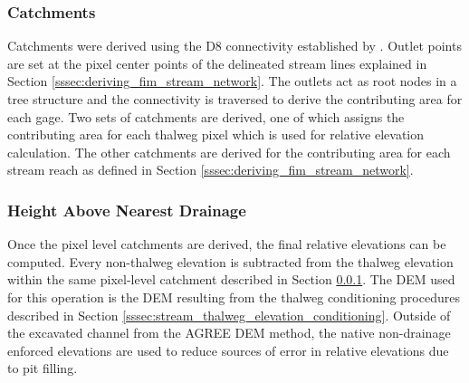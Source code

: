 \subsubsection{Catchments}
\label{sssec:catchments}
%
Catchments were derived using the D8 connectivity established by .
Outlet points are set at the pixel center points of the delineated stream lines explained in Section \ref{sssec:deriving_fim_stream_network}.
The outlets act as root nodes in a tree structure and the connectivity is traversed to derive the contributing area for each gage.
Two sets of catchments are derived, one of which assigns the contributing area for each thalweg pixel which is used for relative elevation calculation.
The other catchments are derived for the contributing area for each stream reach as defined in Section \ref{sssec:deriving_fim_stream_network}. 
%
\subsubsection{Height Above Nearest Drainage}
%
Once the pixel level catchments are derived, the final relative elevations can be computed.
Every non-thalweg elevation is subtracted from the thalweg elevation within the same pixel-level catchment described in Section \ref{sssec:catchments}.
The DEM used for this operation is the DEM resulting from the thalweg conditioning procedures described in Section \ref{sssec:stream_thalweg_elevation_conditioning}.
Outside of the excavated channel from the AGREE DEM method, the native non-drainage enforced elevations are used to reduce sources of error in relative elevations due to pit filling. 
%
